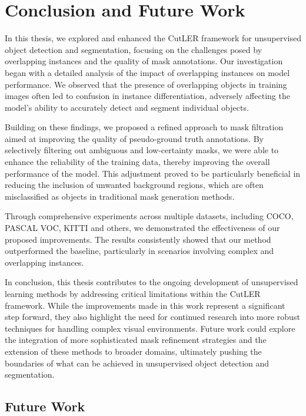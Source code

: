 \chapter{Conclusion and Future Work}\label{chap:conclusion}
In this thesis, we explored and enhanced the CutLER framework for unsupervised object detection and segmentation, focusing on the challenges posed by overlapping instances and the quality of mask annotations. Our investigation began with a detailed analysis of the impact of overlapping instances on model performance. We observed that the presence of overlapping objects in training images often led to confusion in instance differentiation, adversely affecting the model's ability to accurately detect and segment individual objects.

Building on these findings, we proposed a refined approach to mask filtration aimed at improving the quality of pseudo-ground truth annotations. By selectively filtering out ambiguous and low-certainty masks, we were able to enhance the reliability of the training data, thereby improving the overall performance of the model. This adjustment proved to be particularly beneficial in reducing the inclusion of unwanted background regions, which are often misclassified as objects in traditional mask generation methods.

Through comprehensive experiments across multiple datasets, including COCO, PASCAL VOC, KITTI and others, we demonstrated the effectiveness of our proposed improvements. The results consistently showed that our method outperformed the baseline, particularly in scenarios involving complex and overlapping instances.

In conclusion, this thesis contributes to the ongoing development of unsupervised learning methods by addressing critical limitations within the CutLER framework. While the improvements made in this work represent a significant step forward, they also highlight the need for continued research into more robust techniques for handling complex visual environments. Future work could explore the integration of more sophisticated mask refinement strategies and the extension of these methods to broader domains, ultimately pushing the boundaries of what can be achieved in unsupervised object detection and segmentation.

\section{Future Work}
